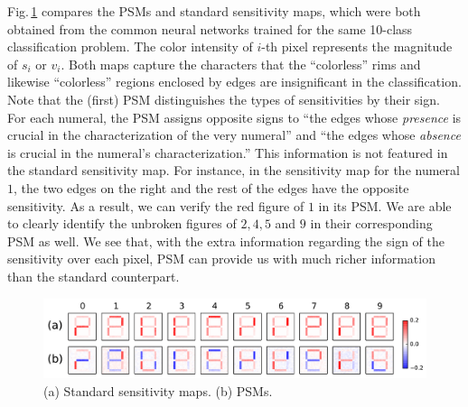 Fig.\,\ref{fig:first_psm} compares the PSMs and standard
sensitivity maps, which were both
obtained from the common neural networks trained for the same
10-class classification problem.
%
The color intensity of $i$-th pixel represents the magnitude of $s_i$ or $v_i$.
%
Both maps capture the characters that the ``colorless''
rims and likewise ``colorless'' regions enclosed by edges are insignificant in the classification.
%
Note that the (first) PSM distinguishes the types of sensitivities by
their sign.
%
For each numeral, the PSM assigns opposite signs to ``the edges whose \textit{presence} is
crucial in the characterization of the very numeral'' and ``the edges
whose \textit{absence} is crucial in the numeral's characterization.''
%
This information is not featured in the standard sensitivity map.
%
For instance, in the sensitivity map for the numeral $1$, the two edges on the
right and the rest of the edges have the opposite sensitivity.
As a result, we can verify the red figure of $1$ in its PSM.
%
We are able to clearly identify the unbroken figures of $2,4,5$ and $9$ in their
corresponding PSM as well.
%
We see that, with the extra information
regarding the sign of the sensitivity over each pixel, PSM can provide
us with much richer information than the standard counterpart.
\begin{figure}[htbp]
 \centering
 \includegraphics[width=0.9\columnwidth]{./fig/first_psm.pdf}
 \caption{(a) Standard sensitivity maps. (b) PSMs.
 }
 \label{fig:first_psm}
\end{figure}

